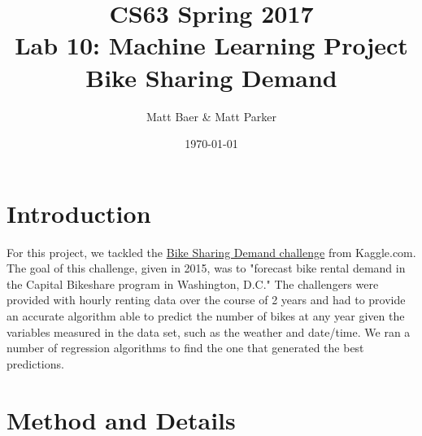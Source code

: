 \documentclass[11pt]{article}
\title{CS63 Spring 2017\\Lab 10: Machine Learning Project\\Bike Sharing Demand}
\author{Matt Baer \& Matt Parker}
\date{\today}
\begin{document}
\maketitle

\section{Introduction}

For this project, we tackled the \href{https://www.kaggle.com/c/bike-sharing-demand}{Bike Sharing Demand challenge} from Kaggle.com. The goal of this challenge, given in 2015, was to "forecast bike rental demand in the Capital Bikeshare program in Washington, D.C." The challengers were provided with hourly renting data over the course of 2 years and had to provide an accurate algorithm able to predict the number of bikes at any year given the variables measured in the data set, such as the weather and date/time. We ran a number of regression algorithms to find the one that generated the best predictions.

\section{Method and Details}
\end{document}
